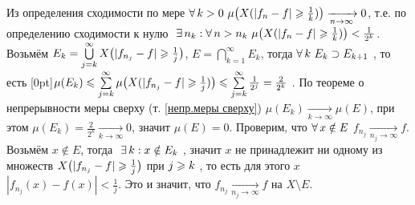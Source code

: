 \begin{prf}
	Из определения сходимости по мере $\forall \, k > 0\ \mu\bigl(X(|f_n - f|\geqslant \frac 1k )\bigr) \xrightarrow[n \to \infty]{} 0$, т.е. по определению сходимости к нулю$\E n_k : \A n > n_k\ \mu\bigl(X(|f_n - f|\biger \frac 1k )\bigr) < \frac{1}{2^k}$. Возьмём $E_k = \bigcup\limits_{j = k}^\infty X \bigl(|f_{n_j} - f| \geqslant \frac 1j\bigr)$, $E = \bigcap\limits_{k = 1}^\infty E_k$, тогда $\forall \, k\ E_k \supset E_{k + 1}$ , то есть \raisebox{0pt}[0pt]{$\mu(E_k) \leqslant \sum\limits_{j = k}^\infty \mu \bigl(X(|f_{n_j} - f| \geqslant \frac 1j)\bigr) \leqslant \sum\limits_{j = k}^\infty \frac {1}{2^j} = \frac{2}{2^k}$} . По теореме о непрерывности меры сверху (т. \ref{непр.меры сверху}) $\mu(E_k) \xrightarrow[k \to \infty]{} \mu(E)$, при этом $\mu(E_k) = \frac{2}{2^k} \xrightarrow[k \to \infty]{} 0$, значит $\mu(E) = 0$. Проверим, что $\forall \, x \notin E$ $f_{n_j} \xrightarrow[n_j \to \infty]{} f$. Возьмём $x \notin E$, тогда$\E k : x \notin E_k$ , значит $x$ не принадлежит ни одному из множеств $X \bigl(|f_{n_j} - f| \geqslant \frac 1j\bigr)$ при $j \geqslant k$ , то есть для этого $x$ $|f_{n_j}(x) - f(x)| < \frac 1j$. Это и значит, что $f_{n_j} \xrightarrow[n_j \to \infty]{} f$ на $X \setminus E$.
\end{prf}
